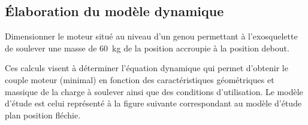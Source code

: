%
%
%
%


\subsection*{Élaboration du modèle dynamique}

\begin{obj}
Dimensionner le moteur situé au niveau d’un genou permettant à l’exosquelette de soulever une masse de \SI{60}{kg} de la position accroupie à la position debout.
\end{obj}
\ifprof
\else
Ces calculs visent à déterminer l’équation dynamique qui permet d’obtenir le couple moteur (minimal) en fonction des caractéristiques géométriques et massique de la charge à soulever ainsi que des conditions d’utilisation.
Le modèle d’étude est celui représenté à la figure suivante correspondant au modèle d’étude plan position fléchie.




